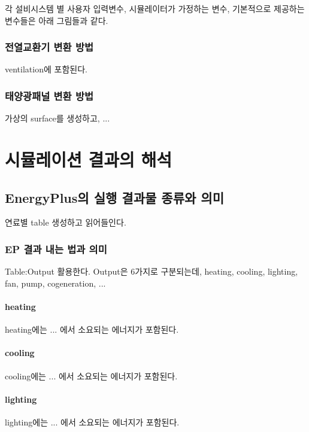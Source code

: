 각 설비시스템 별 사용자 입력변수, 시뮬레이터가 가정하는 변수,  기본적으로 제공하는 변수들은 아래 그림들과 같다.

\subsection{전열교환기 변환 방법}
ventilation에 포함된다.

\subsection{태양광패널 변환 방법}
가상의 surface를 생성하고, ...


\chapter{시뮬레이션 결과의 해석}

\section{EnergyPlus의 실행 결과물 종류와 의미}
연료별 table 생성하고 읽어들인다.

\subsection{EP 결과 내는 법과 의미}
Table:Output 활용한다. Output은 6가지로 구분되는데, heating, cooling, lighting, fan, pump, cogeneration, ...

\subsubsection{heating}
heating에는 ... 에서 소요되는 에너지가 포함된다.

\subsubsection{cooling}
cooling에는 ... 에서 소요되는 에너지가 포함된다.

\subsubsection{lighting}
lighting에는 ... 에서 소요되는 에너지가 포함된다.

